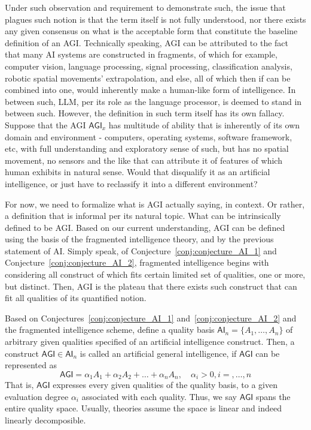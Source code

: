 Under such observation and requirement to demonstrate such, the issue that plagues such notion is that the term itself is not fully understood, nor there exists any given consensus on what is the acceptable form that constitute the baseline definition of an AGI. Technically speaking, AGI can be attributed to the fact that many AI systems are constructed in fragments, of which for example, computer vision, language processing, signal processing, classification analysis, robotic spatial movements' extrapolation, and else, all of which then if can be combined into one, would inherently make a human-like form of intelligence. In between such, LLM, per its role as the language processor, is deemed to stand in between such. However, the definition in such term itself has its own fallacy. Suppose that the AGI $\mathsf{AGI}_{x}$ has multitude of ability that is inherently of its own domain and environment - computers, operating systems, software framework, etc, with full understanding and exploratory sense of such, but has no spatial movement, no sensors and the like that can attribute it of features of which human exhibits in natural sense. Would that disqualify it as an artificial intelligence, or just have to reclassify it into a different environment?

For now, we need to formalize what is AGI actually saying, in context. Or rather, a definition that is informal per its natural topic. What can be intrinsically defined to be AGI. Based on our current understanding, AGI can be defined using the basis of the fragmented intelligence theory, and by the previous statement of AI. Simply speak, of Conjecture~\ref{conj:conjecture_AI_1} and Conjecture~\ref{conj:conjecture_AI_2}, fragmented intelligence begins with considering all construct of which fits certain limited set of qualities, one or more, but distinct. Then, AGI is the plateau that there exists such construct that can fit all qualities of its quantified notion. 

\begin{definition}
    Based on Conjectures~\ref{conj:conjecture_AI_1} and~\ref{conj:conjecture_AI_2} and the fragmented intelligence scheme, define a quality basis $\mathsf{AI}_{n}=\{A_{1},\dots,A_{n}\}$ of arbitrary given qualities specified of an artificial intelligence construct. Then, a construct $\mathsf{AGI}\in\mathsf{AI}_{n}$ is called an artificial general intelligence, if $\mathsf{AGI}$ can be represented as 
    \begin{equation}
        \mathsf{AGI} = \alpha_{1}A_{1} + \alpha_{2}A_{2} + \dots + \alpha_{n}A_{n}, \quad \alpha_{i} > 0, i = ,\dots, n
    \end{equation}
    That is, $\mathsf{AGI}$ expresses every given qualities of the quality basis, to a given evaluation degree $\alpha_{i}$ associated with each quality. Thus, we say $\mathsf{AGI}$ spans the entire quality space. Usually, theories assume the space is linear and indeed linearly decomposible. 
\end{definition}

